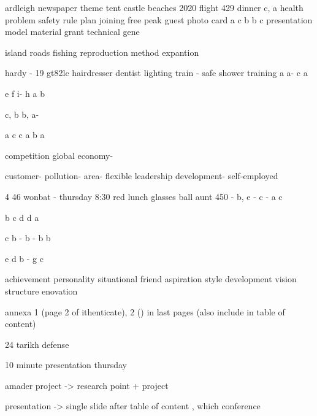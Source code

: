ardleigh
newspaper
theme
tent
castle
beaches
2020
flight
429
dinner
c, a
health problem
safety rule
plan
joining
free
peak
guest
photo card
a
c
b
b
c
presentation
model
material
grant
technical
gene

island
roads
fishing
reproduction
method
expantion




hardy -
19
gt82lc
hairdresser
dentist
lighting
train -
safe
shower
training
a
a-
c
a


e
f
i-
h
a
b

c, b
b, a-


a
c
c
a
b
a




competition
global
economy-

customer-
pollution-
area-
flexible
leadership
development-
self-employed







4
46 wonbat -
thursday
8:30
red
lunch
glasses
ball
aunt
450 -
b, e -
c - 
a 
c



b
c
d
d
a







c
b -
b -
b
b



e
d
b - 
g
c



achievement
personality
situational
friend
aspiration
style
development
vision
structure
enovation









annexa 1 (page 2 of ithenticate), 2 () in last pages (also include in table of content)

24 tarikh defense

10 minute presentation thursday

amader project -> research point + project

presentation -> single slide after table of content , which conference 
